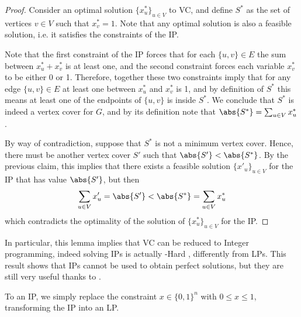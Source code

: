 \documentclass[a4paper, 12pt]{report}
\begin{document}
    \begin{proof}
        Consider an optimal solution $\{x^*_u\}_{u \in V}$ to VC, and define $S^*$ as the set of vertices $v \in V$ such that $x^*_v = 1$. Note that any optimal solution is also a feasible solution, i.e. it satisfies the constraints of the IP.

        Note that the first constraint of the IP forces that for each $\{u, v\} \in E$ the sum between $x^*_u + x^*_v$ is at least one, and the second constraint forces each variable $x_v^*$ to be either 0 or 1. Therefore, together these two constraints imply that for any edge $\{u, v\} \in E$ at least one between $x_u^*$ and $x_v^*$ is 1, and by definition of $S^*$ this means at least one of the endpoints of $\{u, v\}$ is inside $S^*$. We conclude that $S^*$ is indeed a vertex cover for $G$, and by its definition note that $\abs{S^*} = \sum_{u \in V}{x^*_u}$.


        By way of contradiction, suppose that $S^*$ is not a minimum vertex cover. Hence, there must be another vertex cover $S'$ such that $\abs{S'} < \abs{S^*}$. By the previous claim, this implies that there exists a feasible solution $\{x'_u\}_{u \in V}$ for the IP that has value $\abs{S'}$, but then $$\sum_{u \in V}{x'_u} = \abs{S'} < \abs{S^*} = \sum_{u \in V}{x^*_u}$$ which contradicts the optimality of the solution of $\{x^*_u\}_{u \in V}$ for the IP.
    \end{proof}

    In particular, this lemma implies that VC can be reduced to Integer programming, indeed solving IPs is actually \NPclass-Hard \cite{karp}, differently from LPs. This result shows that IPs cannot be used  to obtain perfect solutions, but they are still very useful thanks to .

    To  an IP, we simply replace the constraint $x \in \{0, 1\}^n$ with $0 \le x \le 1$, transforming the IP into an LP.
\end{document}
